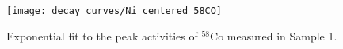 \begin{figure}[htb]
\texttt{[image: decay\_curves/Ni\_centered\_58CO]}
\caption{Exponential fit to the peak activities of $^{58}$Co measured in Sample 1.
}
\label{fig:Ni_centered_58CO}
\end{figure}